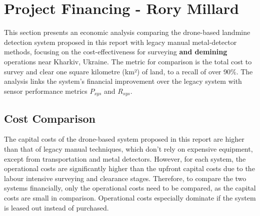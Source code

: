 \newpage
{}
\section{Project Financing - Rory Millard} \label{financing}

This section presents an economic analysis comparing the drone-based landmine detection system proposed in this report with legacy manual metal-detector methods, focusing on the cost-effectiveness for surveying \textbf{and demining} operations near Kharkiv, Ukraine. The metric for comparison is the total cost to survey and clear one square kilometre (km²) of land, to a recall of over 90\%. The analysis links the system's financial improvement over the legacy system with sensor performance metrics $P_{sys}$ and $R_{sys}$.


\subsection{Cost Comparison} \label{subsec:cost_structures}

The capital costs of the drone-based system proposed in this report are higher than that of legacy manual techniques, which don't rely on expensive equipment, except from transportation and metal detectors. However, for each system, the operational costs are significantly higher than the upfront capital costs due to the labour intensive surveying and clearance stages. Therefore, to compare the two systems financially, only the operational costs need to be compared, as the capital costs are small in comparison. Operational costs especially dominate if the system is leased out instead of purchased.

